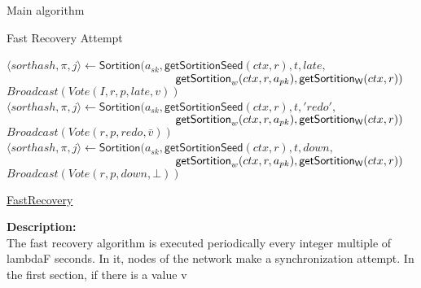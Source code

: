\documentclass[10pt,a4paper]{article}
\begin{document}
\begin{section}{Main algorithm}
\begin{subsection}{Fast Recovery Attempt}
\begin{algorithm}[H]
\begin{algorithmic}[1]
                \State $\langle sorthash, \pi, j\rangle\gets 
                \mathsf{Sortition}(
                a_{sk}, 
                \mathsf{getSortitionSeed}(ctx, r), 
                t, 
                late, $ \newline
                ${}$ ${\hskip 5.2cm}\mathsf{getSortition}_w(ctx, r, a_{pk}), 
                \mathsf{getSortition_W}(ctx, r)
                )$
                    \State $Broadcast(Vote(I, r, p, late, v))$
                \EndIf
                    \State $\langle sorthash, \pi, j\rangle\gets 
                    \mathsf{Sortition}(
                    a_{sk}, 
                    \mathsf{getSortitionSeed}(ctx, r), 
                    t, 
                    'redo', $ \newline
                    ${}$ ${\hskip 5.2cm}\mathsf{getSortition}_w(ctx, r, a_{pk}), 
                    \mathsf{getSortition_W}(ctx, r)
                    )$
                        \State $Broadcast(Vote(r,p,redo,\bar{v}))$
                    \EndIf
            \Else
                \State $\langle sorthash, \pi, j\rangle\gets 
                \mathsf{Sortition}(
                a_{sk}, 
                \mathsf{getSortitionSeed}(ctx, r), 
                t, 
                down, $ \newline
                ${}$ ${\hskip 5.2cm}\mathsf{getSortition}_w(ctx, r, a_{pk}), 
                \mathsf{getSortition_W}(ctx, r)
                )$
                    \State $Broadcast(Vote(r,p,down,\bot))$
                \EndIf
            \EndIf    
        \EndFor


        \EndFunction
        \end{algorithmic}
        \caption{\underline{FastRecovery}}
    \end{algorithm}
    
    
    \noindent \textbf{Description:}\\
    The fast recovery algorithm is executed periodically every integer multiple of lambdaF
    seconds. In it, nodes of the network make a synchronization attempt.
    In the first section, if there is a value v 
\end{subsection}


\end{section}
\end{document}
